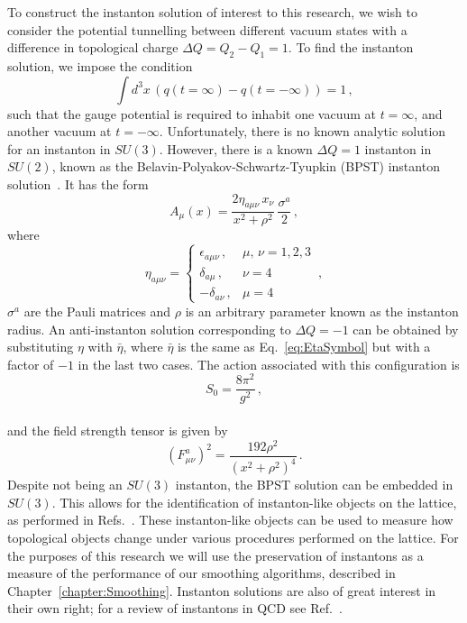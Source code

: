 To construct the instanton solution of interest to this research, we wish to consider the potential tunnelling between different vacuum states with a difference in topological charge $\Delta Q = Q_2-Q_1 =1$. To find the instanton solution, we impose the condition
%
\begin{equation}
\int d^3x \,\left(q(t=\infty)-q(t=-\infty)\right)=1\, ,
\end{equation}
%
such that the gauge potential is required to inhabit one vacuum at $t=\infty$, and another vacuum at $t=-\infty$. Unfortunately, there is no known analytic solution for an instanton in $SU(3)$. However, there is a known $\Delta Q=1$ instanton in $SU(2)$, known as the Belavin-Polyakov-Schwartz-Tyupkin (BPST) instanton solution~\cite{Belavin:1975fg}. It has the form
%
\begin{equation}
A_\mu(x) = \frac{2\eta_{a\mu\nu}\,x_\nu}{x^2+\rho^2}\,\frac{\sigma^a}{2}\, ,
\label{eq:InstantonSolution}
\end{equation}
%
where
%
\begin{equation}
\eta_{a\mu\nu} =
\begin{cases}
\epsilon_{a\mu\nu}\, , & \mu,\,\nu = 1,2,3\\
\delta_{a\mu}\, , & \nu=4\\
-\delta_{a\nu}\, , & \mu=4
\end{cases}\, ,
\label{eq:EtaSymbol}
\end{equation}
%
$\sigma^a$ are the Pauli matrices and $\rho$ is an arbitrary parameter known as the instanton radius. An anti-instanton solution corresponding to $\Delta Q=-1$ can be obtained by substituting $\eta$ with $\bar{\eta}$, where $\bar{\eta}$ is the same as Eq.~\eqref{eq:EtaSymbol} but with a factor of $-1$ in the last two cases. The action associated with this configuration is 
%
\begin{equation}
S_0 = \frac{8\pi^2}{g^2}\, ,
\end{equation}\\
%
and the field strength tensor is given by~\cite{Schafer:1996wv}
%
\begin{equation}
\left(F_{\mu\nu}^a\right)^2 = \frac{192\rho^2}{\left(x^2+\rho^2\right)^4}\, .
\label{eq:InstantonFieldStrength}
\end{equation}
%
Despite not being an $SU(3)$ instanton, the BPST solution can be embedded in $SU(3)$. This allows for the identification of instanton-like objects on the lattice, as performed in Refs.~\cite{Trewartha:2015ida,Moran:2008qd}. These instanton-like objects can be used to measure how topological objects change under various procedures performed on the lattice. For the purposes of this research we will use the preservation of instantons as a measure of the performance of our smoothing algorithms, described in Chapter~\ref{chapter:Smoothing}. Instanton solutions are also of great interest in their own right; for a review of instantons in QCD see Ref.~\cite{Schafer:1996wv}. 

